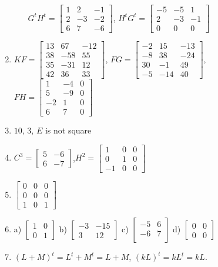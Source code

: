 \begin{enumerate}
\begin{enumerate}
$G^tH^t=\left [\begin {array}{rrr} 1&2&-1\\2&-3&-2
\\6&7&-6\end {array}\right ]$, \quad $H^tG^t=\left [\begin {array}{rrr} -5&-5&1\\2&-3&-1
\\0&0&0\end {array}\right ]$
\end{enumerate}
\item $KF=\left [\begin {array}{rrr} 13&67&-12\\38&-58&55
\\35&-31&12\\42&36&33\end {array}
\right ]$, \quad  $FG=\left [\begin {array}{rrr}
-2&15&-13\\-8&38&-24
\\30&-1&49\\-5&-14&40\end {array}
\right ]$, \\ $FH=\left [\begin {array}{rrr} 1&-4&0\\5&-9&0
\\-2&1&0\\6&7&0\end {array}\right
]$
\item $10$, $3$, $E$ is not square
\item $C^3=\left [\begin {array}{rr} 5&-6\\6&-7\end {array}
\right ]$,\quad $H^2=\left [\begin {array}{rrr} 1&0&0\\0&1&0
\\-1&0&0\end {array}\right ]$
\item $\left [\begin {array}{rrr} 0&0&0\\0&0&0
\\1&0&1\end {array}\right ]$

\item a) $\left [\begin {array}{rr} 1&0\\0&1\end {array} \right ]$
b) $\left [\begin {array}{rr} -3&-15\\3&12\end {array} \right ]$
c) $\left [\begin {array}{rr} -5&6\\-6&7
\\\end {array}\right ]$
d) $\left [\begin {array}{rr} 0&0\\0&0\end {array} \right ]$

\item $(L+M)^{t}=L^{t}+M^{t}=L+M$, $(kL)^{t}=kL^{t}=kL$.
\end{enumerate}

%
\fi 